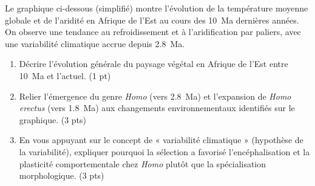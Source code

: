 \documentclass[11pt]{article}
\begin{document}
\begin{exercice}
Le graphique ci-dessous (simplifié) montre l'évolution de la température moyenne globale et de l'aridité en Afrique de l'Est au cours des \SI{10}{Ma} dernières années. On observe une tendance au refroidissement et à l'aridification par paliers, avec une variabilité climatique accrue depuis \SI{2.8}{Ma}.

\begin{center}
\end{center}

\begin{enumerate}
    \item Décrire l'évolution générale du paysage végétal en Afrique de l'Est entre \SI{10}{Ma} et l'actuel. \hfill (1 pt)
    \item Relier l'émergence du genre \textit{Homo} (vers \SI{2.8}{Ma}) et l'expansion de \textit{Homo erectus} (vers \SI{1.8}{Ma}) aux changements environnementaux identifiés sur le graphique. \hfill (3 pts)
    \item En vous appuyant sur le concept de « variabilité climatique » (hypothèse de la variabilité), expliquer pourquoi la sélection a favorisé l'encéphalisation et la plasticité comportementale chez \textit{Homo} plutôt que la spécialisation morphologique. \hfill (3 pts)
\end{enumerate}
\end{exercice}
\end{document}
